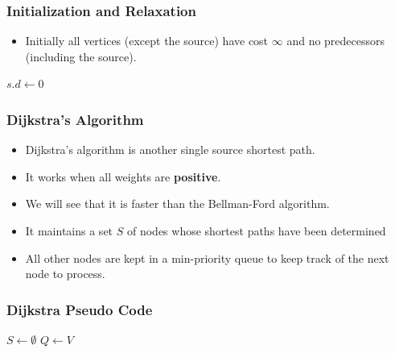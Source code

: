 \documentclass{beamer}
\begin{document}
\begin{frame}
  \frametitle{Initialization and Relaxation}
  \begin{itemize}
  \item Initially all vertices (except the source) have cost $\infty$
    and no predecessors (including the source).
  \end{itemize}
  \begin{algorithm}[H]
\DontPrintSemicolon
\init\;
$s.d\gets 0$\;
\end{algorithm}

\begin{algorithm}[H]
\DontPrintSemicolon
\RELAX\;
\end{algorithm}

\end{frame}







\begin{frame}
  \frametitle{Dijkstra's Algorithm}
  \begin{itemize}
  \item Dijkstra's algorithm is another  single source shortest path.
  \item It works when all weights are \textbf{positive}.
  \item We will see that it is faster than the Bellman-Ford algorithm.
  \item It maintains a set $S$ of nodes whose shortest paths have been
    determined
\item All other nodes are kept in a  min-priority queue to keep track of the next node to process.
  \end{itemize}
\end{frame}

\begin{frame}
  \frametitle{Dijkstra Pseudo Code}
  \begin{algorithm}[H]
\DIJ\;
\DontPrintSemicolon
\init\;
$S\gets\emptyset$\;
$Q\gets V$\;
\end{algorithm}
\end{frame}
\end{document}
